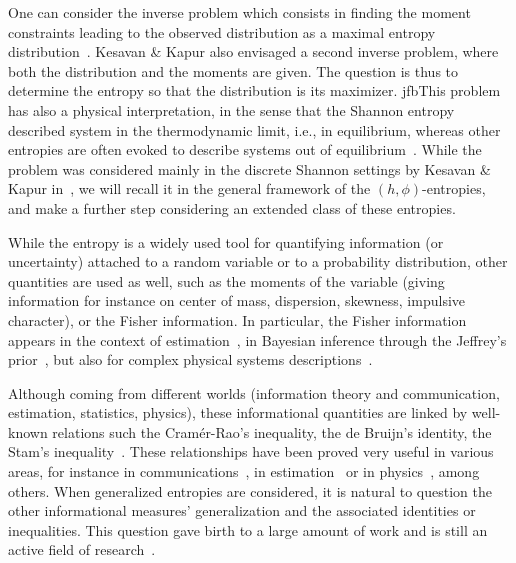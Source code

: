 \documentclass[english,sort&compress]{elsarticle}
\theoremstyle{definition}
\theoremstyle{plain}
\theoremstyle{plain}
\begin{document}
 One  can consider
the inverse problem which consists in  finding the moment constraints leading to
the  observed distribution  as a  maximal entropy  distribution~\cite{KesKap89}.
Kesavan  \& Kapur  also  envisaged  a second  inverse  problem,  where both  the
distribution and the  moments are given.  The question is  thus to determine the
entropy so that  the distribution is its maximizer. jfb{This  problem has also a
  physical  interpretation, in  the  sense that  the  Shannon entropy  described
  system  in  the  thermodynamic  limit, i.e.,  in  equilibrium,  whereas  other
  entropies are often evoked to describe systems out of equilibrium~\cite{Tsa88,
    TsaMen98,  Tsa99,  Tsa09,  EssSch00,  ParBir05}.}   While  the  problem  was
considered  mainly  in  the  discrete  Shannon  settings  by  Kesavan  \&  Kapur
in~\cite{KesKap89},  we  will  recall  it   in  the  general  framework  of  the
$(h,\phi)$-entropies, and make  a further step considering an  extended class of
these entropies.


While  the  entropy is  a  widely  used  tool  for quantifying  information  (or
uncertainty) attached  to a  random variable or  to a  probability distribution,
other quantities are used  as well, such as the moments  of the variable (giving
information  for instance  on center  of mass,  dispersion, skewness,  impulsive
character), or  the Fisher information.   In particular, the  Fisher information
appears in the context of estimation~\cite{Kay93, Fri04}, in Bayesian inference
through the Jeffrey's  prior~\cite{Rob07, Jef46}, but also  for complex physical
systems  descriptions~\cite{Fri04,   VigBer03,  RomAng99,   RomSan06,  SanGon06,
  TorLop15}.


Although  coming from  different worlds  (information theory  and communication,
estimation, statistics,  physics), these informational quantities  are linked by
well-known  relations  such  the  Cram\'er-Rao's  inequality,  the  de  Bruijn's
identity,  the  Stam's  inequality~\cite{CovTho06, Sta59,  DemCov91,  GuoSha05}.
These relationships have been proved very  useful in various areas, for instance
in communications~\cite{Sta59,  DemCov91, CovTho06},  in estimation~\cite{Kay93}
or in  physics~\cite{FolSit97, Sen11}, among others.  When generalized entropies
are  considered, it  is natural  to question  the other  informational measures'
generalization and the associated identities or inequalities. This question gave
birth  to   a  large  amount   of  work  and  is   still  an  active   field  of
research~\cite{Vaj73,  Boe77,  Ham78,  BoeVan80, BurRao82,  LutYan04,  LutYan05,
  LutYan07, LutLv12, Ber12:06_1, Ber12:06_2, Ber13, Ber13:08}.
\end{document}
